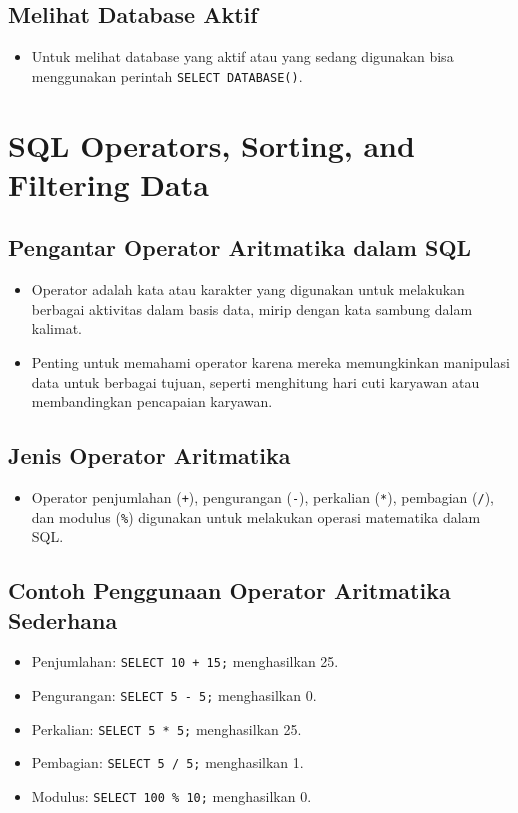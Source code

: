 \documentclass{article}
\begin{document}
\subsection{Melihat Database Aktif}
\begin{itemize}
    \item Untuk melihat database yang aktif atau yang sedang digunakan bisa menggunakan perintah \texttt{SELECT DATABASE()}.
\end{itemize}
\newpage
\section{SQL Operators, Sorting, and Filtering Data}
\subsection{Pengantar Operator Aritmatika dalam SQL}
\begin{itemize}
    \item Operator adalah kata atau karakter yang digunakan untuk melakukan berbagai aktivitas dalam basis data, mirip dengan kata sambung dalam kalimat.
    \item Penting untuk memahami operator karena mereka memungkinkan manipulasi data untuk berbagai tujuan, seperti menghitung hari cuti karyawan atau membandingkan pencapaian karyawan.
\end{itemize}

\subsection{Jenis Operator Aritmatika}
\begin{itemize}
    \item Operator penjumlahan (\texttt{+}), pengurangan (\texttt{-}), perkalian (\texttt{*}), pembagian (\texttt{/}), dan modulus (\texttt{\%}) digunakan untuk melakukan operasi matematika dalam SQL.
\end{itemize}

\subsection{Contoh Penggunaan Operator Aritmatika Sederhana}
\begin{itemize}
    \item Penjumlahan: \texttt{SELECT 10 + 15;} menghasilkan 25.
    \item Pengurangan: \texttt{SELECT 5 - 5;} menghasilkan 0.
    \item Perkalian: \texttt{SELECT 5 * 5;} menghasilkan 25.
    \item Pembagian: \texttt{SELECT 5 / 5;} menghasilkan 1.
    \item Modulus: \texttt{SELECT 100 \% 10;} menghasilkan 0.
\end{itemize}
\end{document}
